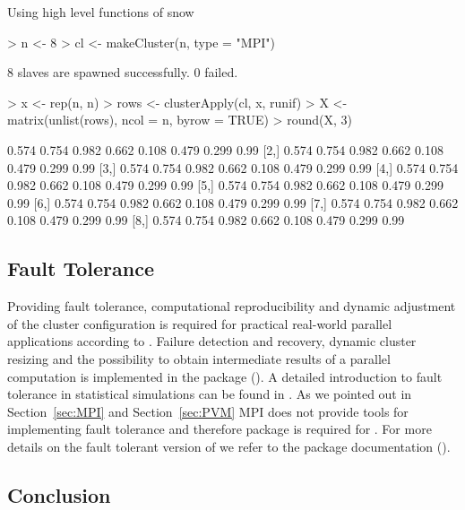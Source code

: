 \begin{Example} Using high level functions of snow
\begin{Schunk}
\begin{Sinput}
> n <- 8
> cl <- makeCluster(n, type = "MPI")
\end{Sinput}
\begin{Soutput}
	8 slaves are spawned successfully. 0 failed.
\end{Soutput}
\begin{Sinput}
> x <- rep(n, n)
> rows <- clusterApply(cl, x, runif)
> X <- matrix(unlist(rows), ncol = n, byrow = TRUE)
> round(X, 3)
\end{Sinput}
\begin{Soutput}
      [,1]  [,2]  [,3]  [,4]  [,5]  [,6]  [,7] [,8]
[1,] 0.574 0.754 0.982 0.662 0.108 0.479 0.299 0.99
[2,] 0.574 0.754 0.982 0.662 0.108 0.479 0.299 0.99
[3,] 0.574 0.754 0.982 0.662 0.108 0.479 0.299 0.99
[4,] 0.574 0.754 0.982 0.662 0.108 0.479 0.299 0.99
[5,] 0.574 0.754 0.982 0.662 0.108 0.479 0.299 0.99
[6,] 0.574 0.754 0.982 0.662 0.108 0.479 0.299 0.99
[7,] 0.574 0.754 0.982 0.662 0.108 0.479 0.299 0.99
[8,] 0.574 0.754 0.982 0.662 0.108 0.479 0.299 0.99
\end{Soutput}
\end{Schunk}
\label{ex:snowapply}
\end{Example}

\subsection{Fault Tolerance}

Providing fault tolerance, computational reproducibility and dynamic
adjustment of the cluster configuration is required for practical
real-world parallel applications according to
\cite{sevcikova04pragmatic}. Failure detection and recovery, dynamic
cluster resizing and the possibility to obtain intermediate results of
a parallel computation is implemented in the package 
(\cite{sevcikova04snowFT}). A detailed introduction to fault tolerance
in statistical simulations can be found in
\cite{sevcikova04simulations}. As we pointed out in
Section~\ref{sec:MPI} and Section~\ref{sec:PVM} MPI does not provide
tools for implementing fault tolerance and therefore package
 is required for . For more details on the fault
tolerant version of  we refer to the package documentation
(\cite{sevcikova04snowFT}).

\subsection{Conclusion}

